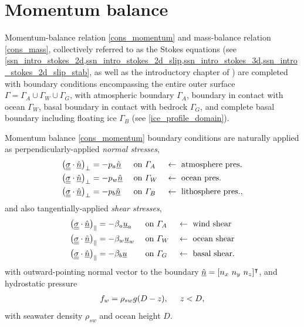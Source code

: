 
\chapter{Momentum balance} \label{ssn_momentum_balance}

Momentum-balance relation \cref{cons_momentum} and mass-balance relation \cref{cons_mass}, collectively referred to as the Stokes equations (see \cref{ssn_intro_stokes_2d,ssn_intro_stokes_2d_slip,ssn_intro_stokes_3d,ssn_intro_stokes_2d_slip_stab}, as well as the introductory chapter of \citet{elman_2005}) are completed with boundary conditions encompassing the entire outer surface $\Gamma = \Gamma_A \cup \Gamma_W \cup \Gamma_G$, with atmospheric boundary $\Gamma_A$, boundary in contact with ocean $\Gamma_W$, basal boundary in contact with bedrock $\Gamma_G$, and complete basal boundary including floating ice $\Gamma_B$ (see \cref{ice_profile_domain}).

Momentum balance \cref{cons_momentum} boundary conditions are naturally applied as perpendicularly-applied \emph{normal stresses},
\begin{align}
  \label{atmosphere_normal_stress}
  \big( \underline{\underline{\sigma}} \cdot \underline{\hat{n}} \big)_{\perp} &= - p_a \underline{\hat{n}} &&\text{ on } \varGamma_A &&\leftarrow \text{ atmosphere pres.} \\
  \label{water_normal_stress}
  \big( \underline{\underline{\sigma}} \cdot \underline{\hat{n}} \big)_{\perp} &= - p_w \underline{\hat{n}} &&\text{ on } \varGamma_W &&\leftarrow \text{ ocean pres.} \\
  \label{bedrock_normal_stress}
  \big( \underline{\underline{\sigma}} \cdot \underline{\hat{n}} \big)_{\perp} &= - p_b \underline{\hat{n}} &&\text{ on } \varGamma_B &&\leftarrow \text{ lithosphere pres.},
\end{align}
and also tangentially-applied \emph{shear stresses},
\begin{align}
  \label{atmosphere_shear_stress}
  \big( \underline{\underline{\sigma}} \cdot \underline{\hat{n}} \big)_{\Vert} &= - \beta_a \underline{u}_a &&\text{ on } \varGamma_A &&\leftarrow \text{ wind shear} \\
  \label{water_shear_stress}
  \big( \underline{\underline{\sigma}} \cdot \underline{\hat{n}} \big)_{\Vert} &= - \beta_w \underline{u}_w &&\text{ on } \varGamma_W &&\leftarrow \text{ ocean shear} \\
  \label{bedrock_shear_stress}
  \big( \underline{\underline{\sigma}} \cdot \underline{\hat{n}} \big)_{\Vert} &= - \beta_b \underline{u}   &&\text{ on } \varGamma_G &&\leftarrow \text{ basal shear}.
\end{align}
with outward-pointing normal vector to the boundary $\normal = [n_x\ n_y\ n_z]^\intercal$, and hydrostatic pressure
\begin{align}
  \label{water_pressure}
  f_w = \rho_{sw} g (D - z), \hspace{5mm} z < D,
\end{align}
with seawater density $\rho_{sw}$ and ocean height $D$.

